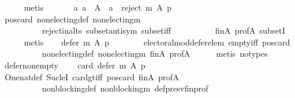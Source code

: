 \begin{isabellebody}
\ \ \ \ \isamarkupfalse%
\ metis\isanewline
\ \ \isamarkupfalse%
\isanewline
\ \ \ \ {\isachardoublequoteopen}{\isasymexists}a{\isachardot}{\kern0pt}\ a\ {\isasymin}\ A\ {\isasymand}\ a\ {\isasymnotin}\ reject\ m\ A\ p{\isachardoublequoteclose}\isanewline
\ \ \ \ \isamarkupfalse%
\ pos{\isacharunderscore}{\kern0pt}card\ non{\isacharunderscore}{\kern0pt}electing{\isacharunderscore}{\kern0pt}def\ non{\isacharunderscore}{\kern0pt}electing{\isacharunderscore}{\kern0pt}m\isanewline
\ \ \ \ \ \ \ \ \ \ reject{\isacharunderscore}{\kern0pt}in{\isacharunderscore}{\kern0pt}alts\ subset{\isacharunderscore}{\kern0pt}antisym\ subset{\isacharunderscore}{\kern0pt}iff\isanewline
\ \ \ \ \ \ \ \ \ \ fin{\isacharunderscore}{\kern0pt}A\ prof{\isacharunderscore}{\kern0pt}A\ subsetI\isanewline
\ \ \ \ \isamarkupfalse%
\ metis\isanewline
\ \ \isamarkupfalse%
\ {\isachardoublequoteopen}defer\ m\ A\ p\ {\isasymnoteq}\ {\isacharbraceleft}{\kern0pt}{\isacharbraceright}{\kern0pt}{\isachardoublequoteclose}\isanewline
\ \ \ \ \isamarkupfalse%
\ electoral{\isacharunderscore}{\kern0pt}mod{\isacharunderscore}{\kern0pt}defer{\isacharunderscore}{\kern0pt}elem\ empty{\isacharunderscore}{\kern0pt}iff\ pos{\isacharunderscore}{\kern0pt}card\isanewline
\ \ \ \ \ \ \ \ \ \ non{\isacharunderscore}{\kern0pt}electing{\isacharunderscore}{\kern0pt}def\ non{\isacharunderscore}{\kern0pt}electing{\isacharunderscore}{\kern0pt}m\ fin{\isacharunderscore}{\kern0pt}A\ prof{\isacharunderscore}{\kern0pt}A\isanewline
\ \ \ \ \isamarkupfalse%
\ {\isacharparenleft}{\kern0pt}metis\ {\isacharparenleft}{\kern0pt}no{\isacharunderscore}{\kern0pt}types{\isacharparenright}{\kern0pt}{\isacharparenright}{\kern0pt}\isanewline
\ \ \isamarkupfalse%
\ defer{\isacharunderscore}{\kern0pt}non{\isacharunderscore}{\kern0pt}empty{\isacharcolon}{\kern0pt}\isanewline
\ \ \ \ {\isachardoublequoteopen}card\ {\isacharparenleft}{\kern0pt}defer\ m\ A\ p{\isacharparenright}{\kern0pt}\ {\isasymge}\ {}{\isachardoublequoteclose}\isanewline
\ \ \ \ \isamarkupfalse%
\ One{\isacharunderscore}{\kern0pt}nat{\isacharunderscore}{\kern0pt}def\ Suc{\isacharunderscore}{\kern0pt}leI\ card{\isacharunderscore}{\kern0pt}gt{\isacharunderscore}{\kern0pt}{}{\isacharunderscore}{\kern0pt}iff\ pos{\isacharunderscore}{\kern0pt}card\ fin{\isacharunderscore}{\kern0pt}A\ prof{\isacharunderscore}{\kern0pt}A\isanewline
\ \ \ \ \ \ \ \ \ \ non{\isacharunderscore}{\kern0pt}blocking{\isacharunderscore}{\kern0pt}def\ non{\isacharunderscore}{\kern0pt}blocking{\isacharunderscore}{\kern0pt}m\ def{\isacharunderscore}{\kern0pt}presv{\isacharunderscore}{\kern0pt}fin{\isacharunderscore}{\kern0pt}prof\isanewline

\end{isabellebody}
